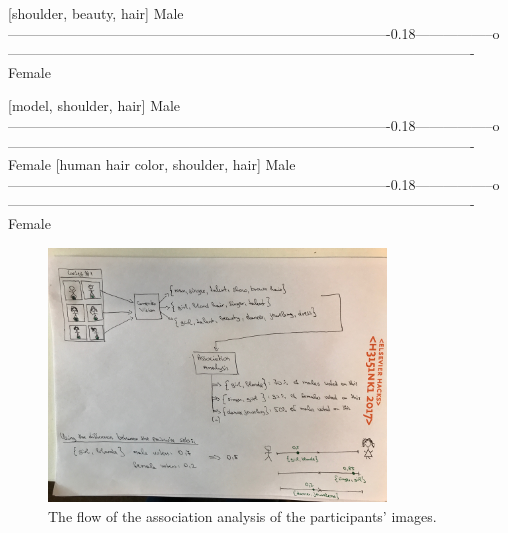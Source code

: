     [shoulder, beauty, hair]
    Male ----------------------------------------------------------------------------------0.18-----------------o---------------------------------------------------------------------------------------------------- Female

    [model, shoulder, hair]
    Male ----------------------------------------------------------------------------------0.18-----------------o---------------------------------------------------------------------------------------------------- Female
    [human hair color, shoulder, hair]
    Male ----------------------------------------------------------------------------------0.18-----------------o---------------------------------------------------------------------------------------------------- Female
        

    \begin{figure}[h] 
        \begin{center}
            \includegraphics[width=0.8\textwidth]{Images/association_analysis_flow.jpg}
            \caption{The flow of the association analysis of the participants' images.}
            \label{association_analysis_flow}
        \end{center}
    \end{figure}

